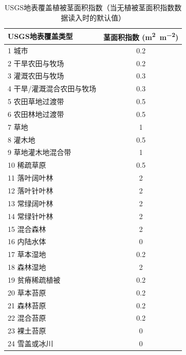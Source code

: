 \begin{table}[htbp]
\centering
\caption[USGS地表覆盖植被茎面积指数]{USGS地表覆盖植被茎面积指数（当无植被茎面积指数数据读入时的默认值）}
\label{tab:USGS地表覆盖植被茎面积指数}
\begin{tabular}{@{}lc@{}}
\toprule
USGS地表覆盖类型     & 茎面积指数 (\unit{m^2.m^{-2}}) \\ \midrule
1 城市           & 0.2       \\
2 干旱农田与牧场      & 0.2       \\
3 灌溉农田与牧场      & 0.3       \\
4 干旱/灌溉混合农田与牧场 & 0.3       \\
5 农田草地过渡带      & 0.5       \\
6 农田林地过渡带      & 0.5       \\
7 草地           & 1         \\
8 灌木地          & 0.5       \\
9 草地灌木地混合带     & 1         \\
10 稀疏草原        & 0.5       \\
11 落叶阔叶林       & 2         \\
12 落叶针叶林       & 2         \\
13 常绿阔叶林       & 2         \\
14 常绿针叶林       & 2         \\
15 混合森林        & 2         \\
16 内陆水体        & 0         \\
17 草本湿地        & 0.2       \\
18 森林湿地        & 2         \\
19 贫瘠稀疏植被      & 0.2       \\
20 草本苔原        & 0.2       \\
21 森林苔原        & 0.2       \\
22 混合苔原        & 0.2       \\
23 裸土苔原        & 0         \\
24 雪盖或冰川       & 0         \\\bottomrule
\end{tabular}
\end{table}

